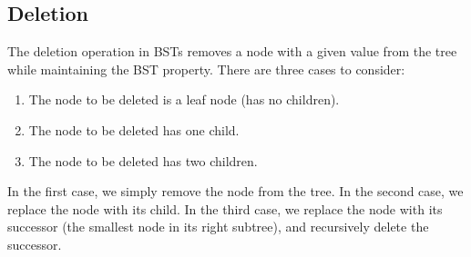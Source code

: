 \documentclass[a4paper, 11pt, oneside]{book} %
\begin{document}
\subsection{Deletion}
The deletion operation in BSTs removes a node with a given value from the tree while maintaining the BST property. There are three cases to consider:

\begin{enumerate}
    \item The node to be deleted is a leaf node (has no children).
    \item The node to be deleted has one child.
    \item The node to be deleted has two children.
\end{enumerate}

In the first case, we simply remove the node from the tree. In the second case, we replace the node with its child. In the third case, we replace the node with its successor (the smallest node in its right subtree), and recursively delete the successor.
\end{document}
